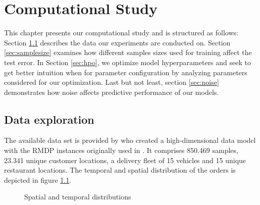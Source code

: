 \chapter{Computational Study}

This chapter presents our computational study and is structured as follows: 
Section \ref{sec:data} describes the data our experiments are conducted on.
Section \ref{sec:samplesize} examines how different samples sizes used for training affect the test error.
In Section \ref{sec:hpo}, we optimize model hyperparameters and seek to get better intuition when for parameter configuration by analyzing parameters considered for our optimization.
Last but not least, section \ref{sec:noise} demonstrates how noise affects predictive performance of our models.

\section{Data exploration}\label{sec:data}
The available data set is provided by \cite{Hildebrandt2020_EAT} who created a high-dimensional data model with the RMDP instances originally used in \cite{UlmerRMDP}. It comprises 850.469 samples, 23.341 unique customer locations, a delivery fleet of 15 vehicles and 15 unique restaurant locations. The temporal and spatial distribution of the orders is depicted in figure \ref{fig:dists}. 
\begin{figure}[h]
	\centering
	\caption{Spatial and temporal distributions}
	\label{fig:dists}
\end{figure}

